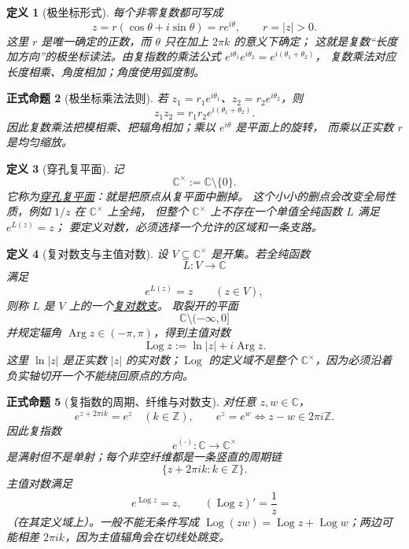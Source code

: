 \documentclass[UTF8,fontset=none,a4paper,11pt]{ctexart}
\theoremstyle{foundation-definition}
\newtheorem{definition}{定义}[section]
\theoremstyle{foundation-theorem}
\theoremstyle{foundation-proposition}
\newtheorem{proposition}[definition]{正式命题}
\theoremstyle{foundation-example}
\theoremstyle{foundation-remark}
\theoremstyle{foundation-theorem}
\newcommand{\term}[2]{\hyperref[#1]{#2}}
\begin{document}
\begin{definition}[极坐标形式]\label{def:polar-form}
每个非零复数都可写成
\[
z=r(\cos\theta+i\sin\theta)=re^{i\theta},
\qquad r=|z|>0.
\]
这里 \(r\) 是唯一确定的正数，而 \(\theta\) 只在加上 \(2\pi k\) 的意义下确定；
这就是复数“长度加方向”的极坐标读法。由复指数的乘法公式
\(e^{i\theta_1}e^{i\theta_2}=e^{i(\theta_1+\theta_2)}\)，
复数乘法对应长度相乘、角度相加；角度使用弧度制。
\end{definition}

\begin{proposition}[极坐标乘法法则]\label{prop:polar-multiplication}
若 \(z_1=r_1e^{i\theta_1}\)、\(z_2=r_2e^{i\theta_2}\)，则
\[
z_1z_2=r_1r_2e^{i(\theta_1+\theta_2)}.
\]
因此复数乘法把模相乘、把辐角相加；乘以 \(e^{i\theta}\) 是平面上的旋转，
而乘以正实数 \(r\) 是均匀缩放。
\end{proposition}

\begin{definition}[穿孔复平面]\label{def:punctured-plane}
记
\[
\mathbb C^\times:=\mathbb C\setminus\{0\}.
\]
它称为\term{def:punctured-plane}{穿孔复平面}：就是把原点从复平面中删掉。
这个小小的删点会改变全局性质，例如 \(1/z\) 在 \(\mathbb C^\times\) 上全纯，
但整个 \(\mathbb C^\times\) 上不存在一个单值全纯函数 \(L\) 满足 \(e^{L(z)}=z\)；
要定义对数，必须选择一个允许的区域和一条支路。
\end{definition}

\begin{definition}[复对数支与主值对数]\label{def:complex-logarithm}
设 \(V\subseteq\mathbb C^\times\) 是开集。若全纯函数
\[
L:V\longrightarrow\mathbb C
\]
满足
\[
e^{L(z)}=z\qquad(z\in V),
\]
则称 \(L\) 是 \(V\) 上的一个\term{def:complex-logarithm}{复对数支}。
取裂开的平面
\[
\mathbb C\setminus(-\infty,0]
\]
并规定辐角 \(\operatorname{Arg}z\in(-\pi,\pi)\)，得到主值对数
\[
\operatorname{Log} z:=\ln|z|+i\operatorname{Arg}z.
\]
这里 \(\ln|z|\) 是正实数 \(|z|\) 的实对数；\(\operatorname{Log}\) 的定义域不是整个
\(\mathbb C^\times\)，因为必须沿着负实轴切开一个不能绕回原点的方向。
\end{definition}

\begin{proposition}[复指数的周期、纤维与对数支]\label{prop:complex-exponential-fibers}
对任意 \(z,w\in\mathbb C\)，
\[
e^{z+2\pi i k}=e^z\quad(k\in\mathbb Z),
\qquad
e^z=e^w\Longleftrightarrow z-w\in2\pi i\mathbb Z.
\]
因此复指数
\[
e^{(\cdot)}:\mathbb C\longrightarrow\mathbb C^\times
\]
是满射但不是单射；每个非空纤维都是一条竖直的周期链
\[
\{z+2\pi i k:k\in\mathbb Z\}.
\]
主值对数满足
\[
e^{\operatorname{Log} z}=z,\qquad (\operatorname{Log} z)'=\frac1z
\]
（在其定义域上）。一般不能无条件写成
\(\operatorname{Log}(zw)=\operatorname{Log} z+\operatorname{Log} w\)；两边可能相差 \(2\pi i k\)，因为主值辐角会在切线处跳变。
\end{proposition}
\end{document}
